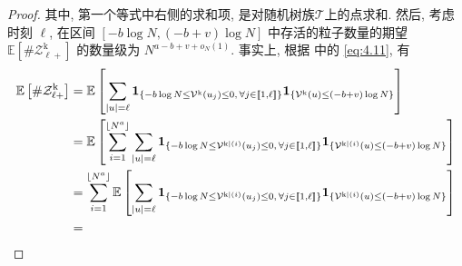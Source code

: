 \begin{proof}
{    }{
        其中, 第一个等式中右侧的求和项, 是对随机树族$\boldsymbol{\mathcal T}$上的点求和.
        然后, 考虑时刻 $\ell$, 在区间 $[-b\log N, (-b+v)\log N]$ 中存活的粒子数量的期望 $\mathbb E[\#\mathcal Z^{\mathrm{k}}_{\ell+}]$ 的数量级为 $N^{a-b+v+o_N(1)}$. 事实上, 根据 中的 \eqref{eq:4.11}, 有
    }
    \begin{align*}
        \mathbb E\left[\#\mathcal Z^{\mathrm{k}}_{\ell+}\right]
        &
        =
        \mathbb E\left[
            \sum_{|u|=\ell}
            {\bf 1}_{
                \{
                    -b\log N
                    \le
                    \mathcal V^{\mathrm{k}}(u_j)
                    \le
                    0,\,
                    \forall j\in[\![1,\ell]\!]
                \}
            }
            {\bf 1}_{
                \{
                    \mathcal V^{\mathrm{k}}(u)
                    \le
                    (-b+v)\log N
                \}
            }
        \right]
        \\
        &
        =
        \mathbb E\left[
            \sum_{i=1}^{\lfloor N^a\rfloor}
            \sum_{|u|=\ell}
            {\bf 1}_{
                \{
                    -b\log N
                    \le
                    \mathcal V^{\mathrm{k}|(i)}(u_j)
                    \le
                    0,\,
                    \forall j\in[\![1,\ell]\!]
                \}
            }
            {\bf 1}_{
                \{
                    \mathcal V^{\mathrm{k}|(i)}(u)
                    \le
                    (-b+v)\log N
                \}
            }
        \right]
        \\
        &
        =
        \sum_{i=1}^{\lfloor N^a\rfloor}
        \mathbb E\left[
            \sum_{|u|=\ell}
            {\bf 1}_{
                \{
                    -b\log N
                    \le
                    \mathcal V^{\mathrm{k}|(i)}(u_j)
                    \le
                    0,\,
                    \forall j\in[\![1,\ell]\!]
                \}
            }
            {\bf 1}_{
                \{
                    \mathcal V^{\mathrm{k}|(i)}(u)
                    \le
                    (-b+v)\log N
                \}
            }
        \right]
        \\
        &
        =

\end{align*}
\end{proof}
